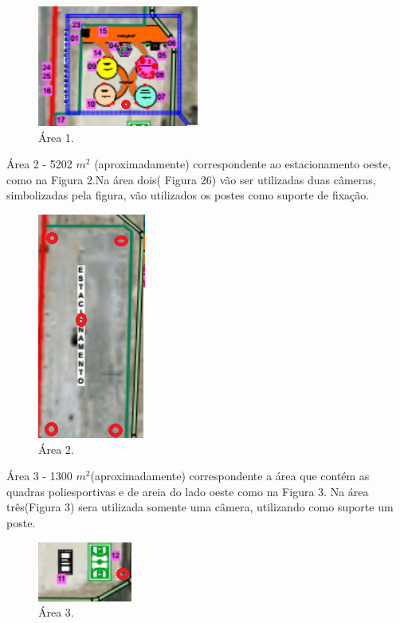 \begin{figure}[H]
	 \centering
	\label{Área 1}
	 \includegraphics[keepaspectratio=true,scale=0.8]{monitoramento/1.png}
	 \caption{Área 1.}
\end{figure}

	Área 2 - 5202 $m^{2}$ (aproximadamente) correspondente ao estacionamento oeste, como na Figura 2.Na área dois( Figura 26) vão ser utilizadas duas câmeras, simbolizadas pela figura, vão utilizados os postes como suporte de fixação.
	
	
\begin{figure}[H]
	 \centering
	\label{Área 2}
	 \includegraphics[keepaspectratio=true,scale=0.8]{monitoramento/2.png}
	 \caption{Área 2.}
\end{figure}
	
	Área 3 - 1300 $m^{2}$(aproximadamente) correspondente a área que contém as quadras poliesportivas e de areia do lado oeste como na Figura 3. Na área três(Figura 3) sera utilizada somente uma câmera, utilizando como suporte um poste.
	
\begin{figure}[H]
	 \centering
	\label{Área 3}
	 \includegraphics[keepaspectratio=true,scale=0.8]{monitoramento/3.png}
	 \caption{Área 3.}
\end{figure}

